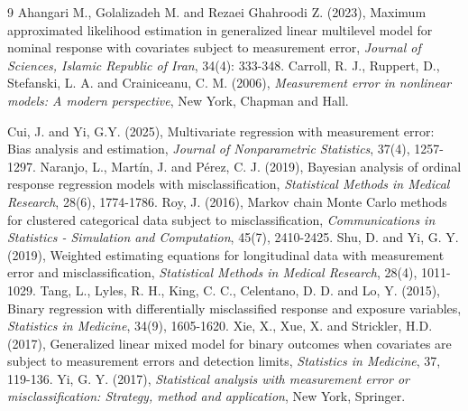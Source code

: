 \documentclass[twoside]{article}
\begin{document}
\begin{thebibliography}{9}
Ahangari M., Golalizadeh M. and Rezaei Ghahroodi Z. (2023), Maximum approximated likelihood estimation in generalized linear multilevel model for nominal response with covariates subject to measurement error, {\it Journal of Sciences, Islamic Republic of Iran}, 34(4): 333-348.
Carroll, R. J., Ruppert, D., Stefanski, L. A. and Crainiceanu, C. M. (2006), {\it Measurement error in nonlinear models: A modern perspective}, New York, Chapman and Hall.

Cui, J. and Yi, G.Y. (2025), Multivariate regression with measurement error: Bias analysis and estimation, {\it Journal of Nonparametric Statistics}, 37(4), 1257-1297.
Naranjo, L., Martín, J. and Pérez, C. J. (2019), Bayesian analysis of ordinal response regression models with misclassification, {\it Statistical Methods in Medical Research}, 28(6), 1774-1786.
Roy, J. (2016), Markov chain Monte Carlo methods for clustered categorical data subject to misclassification, {\it Communications in Statistics - Simulation and Computation}, 45(7), 2410-2425.  
Shu, D. and Yi, G. Y. (2019), Weighted estimating equations for longitudinal data with measurement error and misclassification,  {\it Statistical Methods in Medical Research}, 28(4), 1011-1029. 
Tang, L., Lyles, R. H., King, C. C., Celentano, D. D. and Lo, Y. (2015), Binary regression with differentially misclassified response and exposure variables, {\it Statistics in Medicine}, 34(9), 1605-1620. 
Xie, X., Xue, X. and Strickler, H.D. (2017), Generalized linear mixed model for binary outcomes when covariates are subject to measurement errors and detection limits, {\it Statistics in Medicine}, 37, 119-136. 
Yi, G. Y. (2017), {\it Statistical analysis with measurement error or misclassification: Strategy, method and application}, New York, Springer. 
\end{thebibliography}
 
\end{document}
